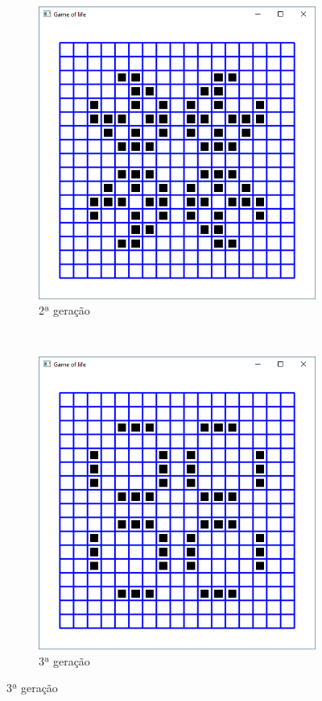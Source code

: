 \begin{enumerate}
\begin{figure}[!htp]
\begin{subfigure}[b]{0.3\textwidth}
        \centerline{\includegraphics[width=.9\textwidth]{img/cap2_ex9b.png}}
        \caption{2ª geração}
        \label{fig:cap03_ex9a}
    \end{subfigure}
    ~
    \begin{subfigure}[b]{0.3\textwidth}
        \centerline{\includegraphics[width=.9\textwidth]{img/cap2_ex9c.png}}
        \caption{3ª geração}
        \label{fig:cap03_ex9a}
    \end{subfigure}
  \end{figure}


\end{enumerate}
